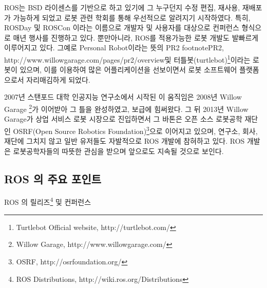 ROS는 BSD 라이센스를 기반으로 하고 있기에 그 누구던지 수정 편집, 재사용, 재배포가 가능하게 되었고 로봇 관련 학회를 통해 우선적으로 알려지기 시작하였다. 특히, ROSDay 및 ROSCon 이라는 이름으로 개발자 및 사용자를 대상으로 컨퍼런스 형식으로 매년 행사를 진행하고 있다. 뿐만아니라, ROS를 적용가능한 로봇 개발도 발빠르게 이루어지고 있다. 그예로 Personal Robot이라는 뜻의 PR2 footnote{PR2, http://www.willowgarage.com/pages/pr2/overview}및 터틀봇(turtlebot)\footnote{Turtlebot Official website, http://turtlebot.com/}이라는 로봇이 있으며, 이를 이용하여 많은 어플리케이션을 선보이면서 로봇 소프트웨어 플랫폼으로서 자리매김하게 되었다. 

2007년 스탠포드 대학 인공지능 연구소에서 시작된 이 움직임은 2008년 Willow Garage \footnote{Willow Garage, http://www.willowgarage.com/}가 이어받아 그 틀을 완성하였고, 보급에 힘써왔다. 그 뒤 2013년 Willow Garage가 상업 서비스 로봇 시장으로 진입하면서 그 바톤은 오픈 소스 로봇공학 재단인 OSRF(Open Source Robotics Foundation)\footnote{OSRF, http://osrfoundation.org/}으로 이어지고 있으며, 연구소, 회사, 재단에 그치지 않고 일반 유저들도 자발적으로 ROS 개발에 참혀하고 있다. ROS 개발은 로봇공학자들의 따뜻한 관심을 받으며 앞으로도 지속될 것으로 보인다.

\subsection{ROS 의 주요 포인트}

ROS 의 릴리즈\footnote{ROS Distributions, http://wiki.ros.org/Distributions} 및 컨퍼런스

